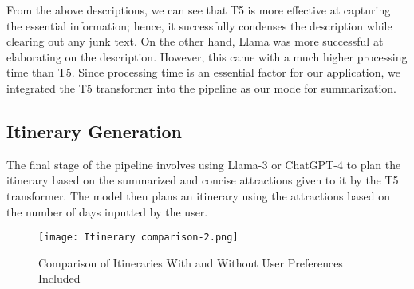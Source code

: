 \documentclass[manuscript,review,anonymous]{acmart}
\begin{document}
    From the above descriptions, we can see that T5 is more effective at capturing the essential information; hence, it successfully condenses the description while clearing out any junk text. On the other hand, Llama was more successful at elaborating on the description. However, this came with a much higher processing time than T5. Since processing time is an essential factor for our application, we integrated the T5 transformer into the pipeline as our mode for summarization.
    
    \vspace{-7pt}
    
    \subsection{Itinerary Generation}
        The final stage of the pipeline involves using Llama-3 or ChatGPT-4 to plan the itinerary based on the summarized and concise attractions given to it by the T5 transformer. The model then plans an itinerary using the attractions based on the number of days inputted by the user.
        
        \vspace{-65pt}
        
        \begin{figure}[H]
            \centering
            \texttt{[image: Itinerary comparison-2.png]}
            \caption{Comparison of Itineraries With and Without User Preferences Included}
            \label{fig:itinerary_comparison}
        \end{figure}
        
        \vspace{-7pt}
        
\end{document}
